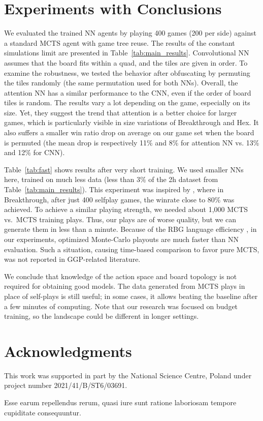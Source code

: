 \documentclass[letterpaper]{article} %
\begin{document}
\section{Experiments with Conclusions}

We evaluated the trained NN agents by playing 400 games (200 per side) against a standard MCTS agent with game tree reuse. The results of the constant simulations limit are presented in Table~\ref{tab:main_results}.
Convolutional NN assumes that the board fits within a quad, and the tiles are given in order.
To examine the robustness, we tested the behavior after obfuscating by permuting the tiles randomly (the same permutation used for both NNs).
Overall, the attention NN has a similar performance to the CNN, even if the order of board tiles is random. The results vary a lot depending on the game, especially on its size.
Yet, they suggest the trend that attention is a better choice for larger games, which is particularly visible in size variations of Breakthrough and Hex.
It also suffers a smaller win ratio drop on average on our game set when the board is permuted (the mean drop is respectively 11\% and 8\% for attention NN vs. 13\% and 12\% for CNN).

Table~\ref{tab:fast} shows results after very short training.
We used smaller NNs here, trained on much less data (less than $3\%$ of the 2h dataset from Table~\ref{tab:main_results}).
This experiment was inspired by \cite{ThielscherAAAI20}, where in Breakthrough, after just 400 selfplay games, the winrate close to 80\% was achieved.
To achieve a similar playing strength, we needed about 1,000 MCTS vs.\ MCTS training plays. Thus, our plays are of worse quality, but we can generate them in less than a minute.
Because of the RBG language efficiency \cite{Kowalski2020EfficientReasoning}, in our experiments, optimized Monte-Carlo playouts are much faster than NN evaluation. Such a situation, causing time-based comparison to favor pure MCTS, was not reported in GGP-related literature.

We conclude that knowledge of the action space and board topology is not required for obtaining good models.
The data generated from MCTS plays in place of self-plays is still useful; in some cases, it allows beating the baseline after a few minutes of computing.
Note that our research was focused on budget training, so the landscape could be different in longer settings.




\section{Acknowledgments}
This work was supported in part by the National Science Centre, Poland under project number 2021/41/B/ST6/03691.

Esse earum repellendus rerum, quasi iure sunt ratione laboriosam tempore cupiditate consequuntur.\clearpage

\end{document}
